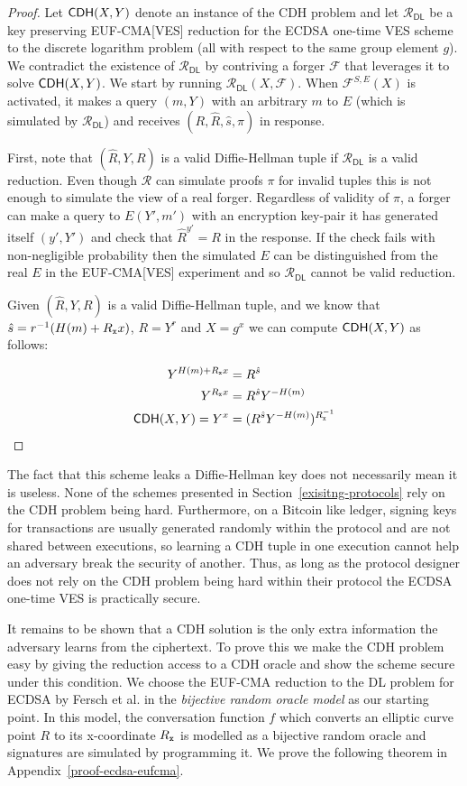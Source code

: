\documentclass[fullpage]{article}
\theoremstyle{definition}
\newcommand{\EUFCMA}{\textsf{EUF-CMA}\xspace}
\newcommand{\EUFCMAVES}{\textsf{EUF-CMA}[\textsf{VES}]\xspace}
\newcommand{\F}{\mathcal{F}}
\newcommand{\R}{\mathcal{R}}
\newcommand{\RDL}{\mathcal{R}_{\DLOG}}
\newcommand{\DLOG}{\textsf{DL}\xspace}
\begin{document}
\begin{proof}
Let $\textsf{CDH}(X,Y)$ denote an instance of the CDH problem and let $\RDL$ be a key preserving \EUFCMAVES reduction for the ECDSA one-time VES scheme to the discrete logarithm problem (all with respect to the same group element $g$). We contradict the existence of $\RDL$ by contriving a forger $\F$ that leverages it to solve $\textsf{CDH}(X,Y)$. We start by running $\R_{\DLOG}(X, \F)$. When $\F^{S,E}(X)$ is activated, it makes a query $(m,Y)$ with an arbitrary $m$ to $E$ (which is simulated by $\RDL$) and receives $(R, \hat{R}, \hat{s}, \pi)$ in response.

First, note that $(\hat{R},Y,R)$ is a valid Diffie-Hellman tuple if $\RDL$ is a valid reduction. Even though $\R$ can simulate proofs $\pi$ for invalid tuples this is not enough to simulate the view of a real forger. Regardless of validity of $\pi$, a forger can make a query to $E(Y',m')$ with an encryption key-pair it has generated itself $(y',Y')$ and check that $\hat{R}^{y'} = R$ in the response. If the check fails with non-negligible probability then the simulated $E$ can be distinguished from the real $E$ in the \EUFCMAVES experiment and so $\RDL$ cannot be valid reduction.

Given $(\hat{R},Y,R)$ is a valid Diffie-Hellman tuple, and we know that $\hat{s} = r^{-1}(H(m) + R_\texttt{x}{}x)$,  $R = Y^r$ and $X = g^x$ we can compute $\textsf{CDH}(X,Y)$ as follows:

\begin{align*}
    Y^{H(m) + R_\texttt{x}{}x} & = R^{\hat{s}}  \\
    Y^{R_\texttt{x}{}x}   & = R^{\hat{s}}Y^{-H(m)}\\
    \textsf{CDH}(X,Y) =  Y^{x} & = (R^{\hat{s}}Y^{-H(m)})^{R_\texttt{x}^{-1}}
\end{align*}
\end{proof}

The fact that this scheme leaks a Diffie-Hellman key does not necessarily mean it is useless. None of the schemes presented in Section~\ref{exisitng-protocols} rely on the CDH problem being hard. Furthermore, on a Bitcoin like ledger, signing keys for transactions are usually generated randomly within the protocol and are not shared between executions, so learning a CDH tuple in one execution cannot help an adversary break the security of another. Thus, as long as the protocol designer does not rely on the CDH problem being hard within their protocol the ECDSA one-time VES is practically secure.

It remains to be shown that a CDH solution is the only extra information the adversary learns from the ciphertext. To prove this we make the CDH problem easy by giving the reduction access to a CDH oracle and show the scheme secure under this condition. We choose the \EUFCMA reduction to the \DLOG problem for ECDSA by Fersch et al.\cite{ecdsa-eufcma} in the \emph{bijective random oracle model} as our starting point. In this model, the conversation function $f$ which converts an elliptic curve point $R$ to its x-coordinate $R_\texttt{x}$ is modelled as a bijective random oracle and signatures are simulated by programming it. We prove the following theorem in Appendix~\ref{proof-ecdsa-eufcma}.
\end{document}
